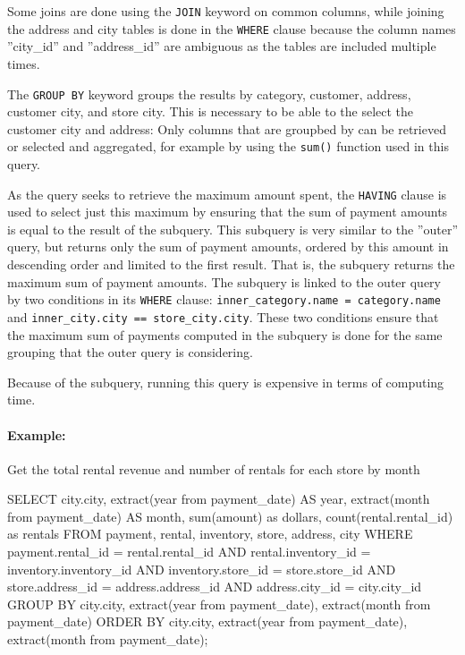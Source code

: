 Some joins are done using the \texttt{JOIN} keyword on common columns, while joining the address and city tables is done in the \texttt{WHERE} clause because the column names ''city\_id'' and ''address\_id'' are ambiguous as the tables are included multiple times. 

The \texttt{GROUP BY} keyword groups the results by category, customer, address, customer city, and store city. This is necessary to be able to the select the customer city and address: Only columns that are groupbed by can be retrieved or selected and aggregated, for example by using the \texttt{sum()} function used in this query. 

As the query seeks to retrieve the maximum amount spent, the \texttt{HAVING} clause is used to select just this maximum by ensuring that the sum of payment amounts is equal to the result of the subquery. This subquery is very similar to the ''outer'' query, but returns only the sum of payment amounts, ordered by this amount in descending order and limited to the first result. That is, the subquery returns the maximum sum of payment amounts. The subquery is linked to the outer query by two conditions in its \texttt{WHERE} clause: \texttt{inner\_category.name = category.name} and \texttt{inner\_city.city == store\_city.city}. These two conditions ensure that the maximum sum of payments computed in the subquery is done for the same grouping that the outer query is considering.

Because of the subquery, running this query is expensive in terms of computing time.

\paragraph*{Example:}
Get the total rental revenue and number of rentals for each store by month


\begin{samepage}
\begin{sqlcode}
SELECT city.city, 
       extract(year from payment_date) AS year, 
       extract(month from payment_date) AS month, 
       sum(amount) as dollars, 
       count(rental.rental_id) as rentals
FROM payment, rental, inventory, store, address, city
WHERE payment.rental_id = rental.rental_id AND
      rental.inventory_id = inventory.inventory_id AND
      inventory.store_id = store.store_id AND
      store.address_id = address.address_id AND
      address.city_id = city.city_id
GROUP BY city.city, 
         extract(year from payment_date), 
         extract(month from payment_date)
ORDER BY city.city, 
         extract(year from payment_date), 
         extract(month from payment_date);
\end{sqlcode}
\end{samepage}


